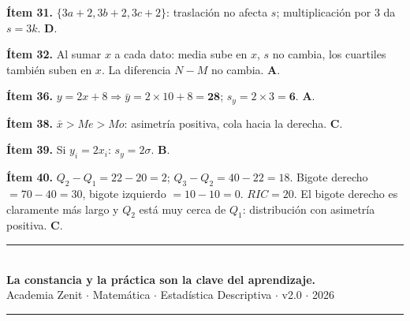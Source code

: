 \documentclass[11pt, letterpaper]{article}
\begin{document}
\textbf{Ítem 31.} $\{3a+2,3b+2,3c+2\}$: traslación no afecta $s$; multiplicación por 3 da $s=3k$. \textbf{D}.

\textbf{Ítem 32.} Al sumar $x$ a cada dato: media sube en $x$, $s$ no cambia, los cuartiles también suben en $x$. La diferencia $N-M$ no cambia. \textbf{A}.

\textbf{Ítem 36.} $y=2x+8 \Rightarrow \bar{y}=2\times10+8=\mathbf{28}$; $s_y=2\times3=\mathbf{6}$. \textbf{A}.

\textbf{Ítem 38.} $\bar{x}>Me>Mo$: asimetría positiva, cola hacia la derecha. \textbf{C}.

\textbf{Ítem 39.} Si $y_i=2x_i$: $s_y=2\sigma$. \textbf{B}.

\textbf{Ítem 40.} $Q_2-Q_1=22-20=2$; $Q_3-Q_2=40-22=18$. Bigote derecho $=70-40=30$, bigote izquierdo $=10-10=0$. $RIC=20$. El bigote derecho es claramente más largo y $Q_2$ está muy cerca de $Q_1$: distribución con asimetría positiva. \textbf{C}.

\vspace{8pt}
\begin{center}
  \rule{\linewidth}{1.5pt}\\[4pt]
  {\large\bfseries\color{zenitnavy} La constancia y la práctica son la clave del aprendizaje.}\\[2pt]
  {\color{zenitgold}\small Academia Zenit $\cdot$ Matemática $\cdot$ Estadística Descriptiva $\cdot$ v2.0 $\cdot$ 2026}\\[2pt]
  \rule{\linewidth}{1.5pt}
\end{center}
\end{document}
